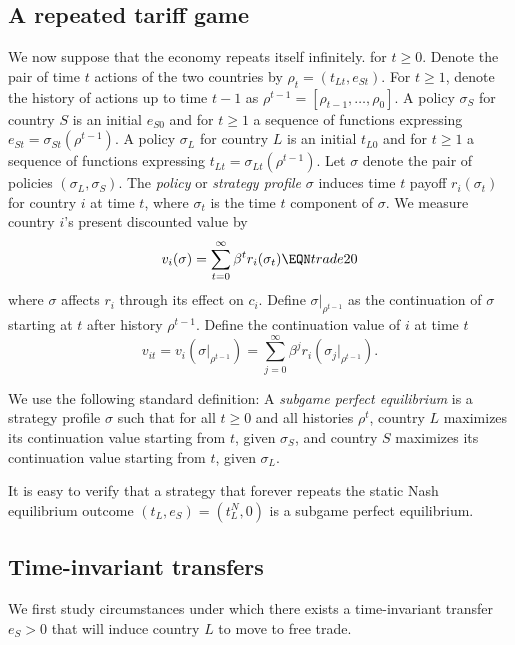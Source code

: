 \subsection{A repeated tariff game}

We now suppose that the economy repeats itself infinitely.
for $t \geq 0$.
Denote the pair of time $t$ actions of the
two countries by $\rho_t= (t_{Lt},  e_{St})$.  For $t \geq 1$, denote
the history of actions up to time $t-1$
as $\rho^{t-1} = [\rho_{t-1}, \ldots, \rho_0]$.
A policy $\sigma_{S}$ for country $S$ is an initial $e_{S0}$ and for $t\geq 1$
a sequence of functions expressing $e_{St}= \sigma_{St}(\rho^{t-1})$.
A policy $\sigma_{L}$
for country $L$ is an initial $t_{L0}$ and for $t\geq 1$
a sequence of functions expressing $t_{Lt}= \sigma_{Lt}(\rho^{t-1})$.
Let $\sigma$ denote the pair of policies $(\sigma_{L},  \sigma_S)$.
The {\it policy\/} or {\it strategy profile\/}
 $\sigma$ induces time $t$ payoff
$r_i(\sigma_t)$ for country
$i$ at time $t$, where $\sigma_t$ is the time $t$ component of
$\sigma$.
We measure country
$i$'s present discounted   value by
$$ v_i(\sigma) = \sum_{t=0}^\infty \beta^t r_i(\sigma_t) \EQN trade20 $$
where $\sigma$ affects $r_i$ through its effect on $c_i$.
Define $\sigma|_{\rho^{t-1}}$ as the continuation of $\sigma$ starting at
$t$  after
history  $\rho^{t-1}$.
Define the continuation value of $i$ at time $t$
$$ v_{it} = v_i(\sigma|_{\rho^{t-1}}) =
 \sum_{j=0}^\infty \beta^j r_i(\sigma_j|_{\rho^{t-1}}). $$

We use the following standard definition:
\medskip
{}
A {\it subgame perfect equilibrium\/} is a strategy profile $\sigma$
such that for all $t\geq 0$ and all histories $\rho^t$, country
$L$ maximizes its continuation value starting from $t$, given
$\sigma_S$, and country $S$  maximizes its continuation    value
starting from $t$, given $\sigma_{L}$.
\medskip

It is easy to verify that a strategy that forever repeats the
static Nash equilibrium outcome $(t_L, e_S)= (t_L^N, 0)$ is
a subgame perfect equilibrium.


\subsection{Time-invariant transfers}

We first study circumstances under which
there exists a time-invariant transfer
$e_S >0$ that will induce country $L$ to move  to free trade.


